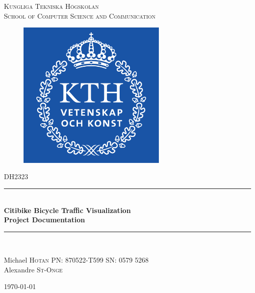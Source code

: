 \documentclass{scrartcl}
\newcommand{\HRule}{\rule{\linewidth}{0.5mm}}
\begin{document}
\lstset{style=sharpc}

\begin{titlepage}
\begin{center}


\textsc{ Kungliga Tekniska Högskolan \\ School of Computer Science and Communication}\\[1.5cm]

\begin{figure}[ht]
\begin{center}
\includegraphics[width=0.65\textwidth]{KTH}
\end{center}
\end{figure}

\textsc{\Large DH2323}\\[0.5cm]

\HRule \\[0.4cm]
 { \huge \bfseries Citibike Bicycle Traffic Visualization \\[0.4cm] }
{\large \bfseries  Project Documentation\\[0.4cm] }

\HRule \\[1.5cm]

\begin{minipage}{0.65\textwidth}
\begin{flushleft} \large
Michael \textsc{Hotan} PN: 870522-T599 SN: 0579 5268\\
Alexandre \textsc{St-Onge}\\
\end{flushleft}
\end{minipage}

\vfill

{\large \today}

\end{center} 
\end{titlepage}
\end{document}
